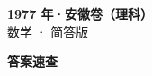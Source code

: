 \documentclass[zihao=-4, a4paper]{ctexart}
\begin{document}
\begin{center}
  {\Large\bfseries 1977 年·安徽卷（理科）}\\[4pt]
  {\large 数学 · 简答版}
\end{center}
\medskip
{}

\clearpage
{}
\begin{center}{\Large\bfseries 答案速查}\end{center}
\medskip

\end{document}
